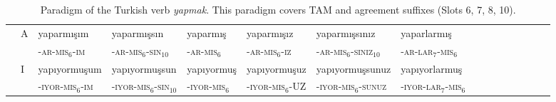 \documentclass[11pt,letterpaper]{article}
\begin{document}
\begin{table}
{\begin{tabular}{ll||lll|lllllllllll}
               & A & yaparmışım &	yaparmışsın &	yaparmış &	yaparmışız &	yaparmışsınız& 	yaparlarmış \\ 
            &  & -\textsc{ar}-\textsc{mis}$_6$-\textsc{im} &	-\textsc{ar}-\textsc{mis}$_6$-\textsc{sin}$_{10}$ &	-\textsc{ar}-\textsc{mis}$_6$ &	-\textsc{ar}-\textsc{mis}$_6$-\textsc{iz} &	-\textsc{ar}-\textsc{mis}$_6$-\textsc{siniz}$_{10}$& 	-\textsc{ar}-\textsc{lar}$_{7}$-\textsc{mis}$_6$ \\ \hline
               & I & yapıyormuşum &	yapıyormuşsun &	yapıyormuş &	yapıyormuşuz &	yapıyormuşsunuz &	yapıyorlarmuş \\
               &              & -\textsc{iyor}-\textsc{mis}$_6$-\textsc{im} &	-\textsc{iyor}-\textsc{mis}$_6$-\textsc{sin}$_{10}$ &	-\textsc{iyor}-\textsc{mis}$_6$ &	-\textsc{iyor}-\textsc{mis}$_6$-UZ &	-\textsc{iyor}-\textsc{mis}$_6$-\textsc{sunuz} &	-\textsc{iyor}-\textsc{lar}$_{7}$-\textsc{mis}$_6$ \\
\end{tabular}
}
\caption{Paradigm of the Turkish verb \textit{yapmak}. This paradigm covers TAM and agreement suffixes (Slots 6, 7, 8, 10).}\label{tab:turkish-yapmak}
\end{table}
\end{document}
